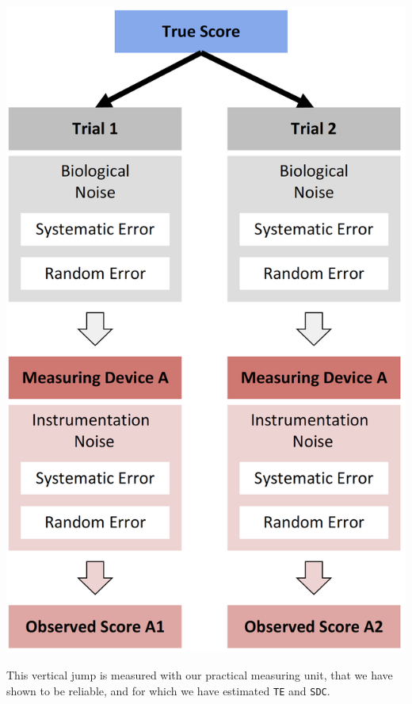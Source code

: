 \documentclass[
]{book}
\begin{document}
\begin{center}\includegraphics[width=0.5\linewidth]{figures/measurement-error-two-measures} \end{center}

This vertical jump is measured with our practical measuring unit, that we have shown to be reliable, and for which we have estimated \texttt{TE} and \texttt{SDC}.
\end{document}
